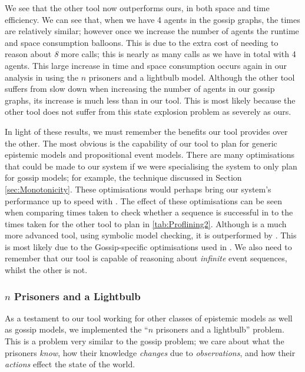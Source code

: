 \documentclass[10pt, a4paper]{report}
\begin{document}
We see that the other tool now outperforms ours, in both space and time
efficiency. We can see that, when we have 4 agents in the gossip graphs, the
times are relatively similar; however once we increase the number of agents the
runtime and space consumption balloons. This is due to the extra cost of needing
to reason about \emph{8} more calls; this is nearly as many calls as we have in
total with 4 agents. This large increase in time and space consumption occurs
again in our analysis in using the $n$ prisoners and a lightbulb model. Although
the other tool suffers from slow down when increasing the number of agents in
our gossip graphs, its increase is much less than in our tool. This is most
likely because the other tool does not suffer from this state explosion problem
as severely as ours. 

In light of these results, we must remember the benefits our tool provides over
the other. The most obvious is the capability of our tool to plan for generic
epistemic models and propositional event models. There are many optimisations
that could be made to our system if we were specialising the system to only plan
for gossip models; for example, the technique discussed in Section
\ref{sec:Monotonicity}. These optimisations would perhaps bring our system's
performance up to speed with \cite{GithubGossip}. The effect of these
optimisations can be seen when comparing times taken to check whether a sequence
is successful in \cite{SMCDEL} to the times taken for the other tool to plan in
\ref{tab:Proflining2}. Although \cite{SMCDEL} is a much more advanced tool,
using symbolic model checking, it is outperformed by \cite{GithubGossip}. This
is most likely due to the Gossip-specific optimisations used in
\cite{GithubGossip}. We also need to remember that our tool is capable of
reasoning about \emph{infinite} event sequences, whilst the other is not. 

\subsubsection{$n$ Prisoners and a Lightbulb}
\label{sec:Prisoners}

As a testament to our tool working for other classes of epistemic models as well
as gossip models, we implemented the ``$n$ prisoners and a lightbulb'' problem.
This is a problem very similar to the gossip problem; we care about what the
prisoners \emph{know}, how their knowledge \emph{changes} due to
\emph{observations}, and how their \emph{actions} effect the state of the world. 
\end{document}
